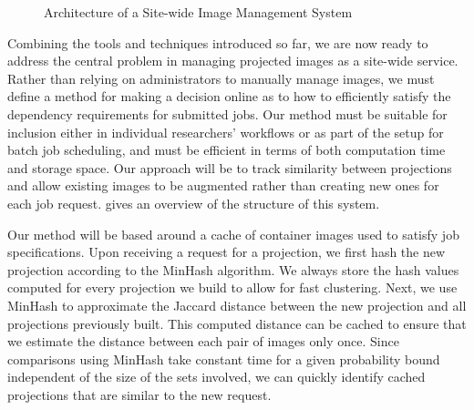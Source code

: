 \documentclass[sigconf]{acmart}
\begin{document}
\begin{figure}
\centering
{}
\caption{Architecture of a Site-wide Image Management System}
\label{figure:sys-arch}
\end{figure}

 Combining the tools and techniques introduced so far,
we are now ready to address the central problem in managing projected images as a site-wide service.
Rather than relying on administrators to manually manage images,
we must define a method for making a decision online as to how to efficiently satisfy the dependency requirements for submitted jobs.
Our method must be suitable for inclusion either in individual researchers' workflows or as part of the setup for batch job scheduling, and must be efficient in terms of both computation time and storage space.
Our approach will be to track similarity between projections and allow existing images to be augmented rather than creating new ones for each job request.
 gives an overview of the structure of this system.

Our method will be based around a cache of container images used to satisfy job specifications.
Upon receiving a request for a projection,
we first hash the new projection according to the MinHash algorithm.
We always store the hash values computed for every projection we build to allow for fast clustering.
Next, we use MinHash to approximate the Jaccard distance between the new projection and all projections previously built.
This computed distance can be cached to ensure that we estimate the distance between each pair of images only once.
Since comparisons using MinHash take constant time for a given probability bound independent of the size of the sets involved,
we can quickly identify cached projections that are similar to the new request.
\end{document}
